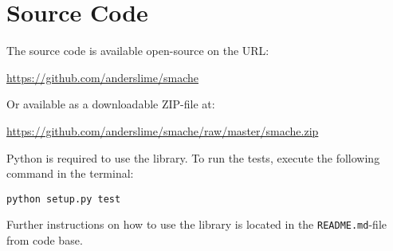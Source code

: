 \chapter{Source Code}
\label{chapter:source-code}

The source code is available open-source on the URL:

\url{https://github.com/anderslime/smache}

Or available as a downloadable ZIP-file at:

\url{https://github.com/anderslime/smache/raw/master/smache.zip}

Python is required to use the library. To run the tests, execute the following command in the terminal:

\verb$python setup.py test$

Further instructions on how to use the library is located in the \verb$README.md$-file from code base.


